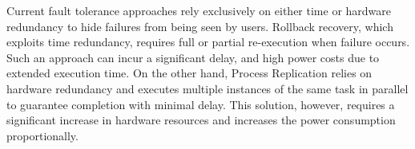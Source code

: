 Current fault tolerance approaches rely exclusively on either time or hardware redundancy to hide failures from being seen by users. 
Rollback recovery, which exploits time redundancy, requires full or partial re-execution when failure occurs.  
Such an approach
can incur a significant delay, %
and high power costs due to extended execution time.
On the other hand, Process Replication relies on hardware redundancy and executes multiple
instances of the same task in parallel to guarantee completion with minimal delay. 
This solution, however, requires a significant increase in hardware resources and increases the power consumption proportionally. 